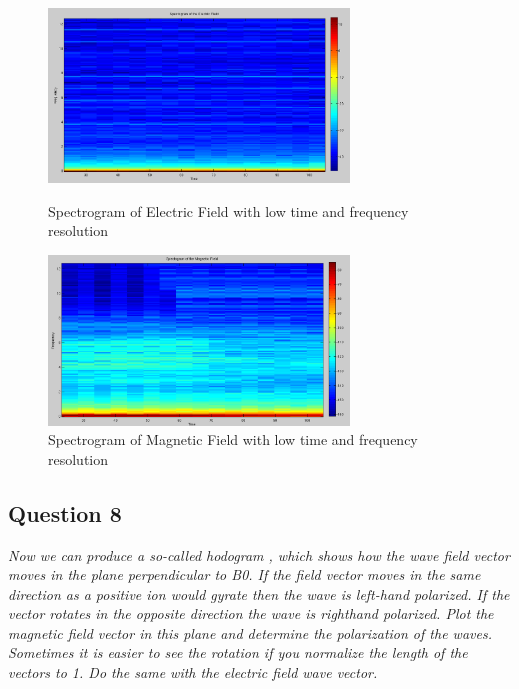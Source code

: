 \documentclass{article}
\begin{document}
\begin{figure}[ht]
\begin{minipage}[c]{0.5\linewidth}
\centering
\includegraphics[width=8cm]{Figures/spectrogram_electricLR.png}
\caption{Spectrogram of Electric Field with low time and frequency resolution}
\label{fig:spectrogram_electricLR}
\end{minipage}
\hspace{0.1cm}
\begin{minipage}[c]{0.5\linewidth}
\centering
\includegraphics[width=8cm]{Figures/spectrogram_magneticLR.png}
\caption{Spectrogram of Magnetic Field with low time and frequency resolution}
\label{fig:spectrogram_magneticLR}
\end{minipage}
\end{figure}

\subsection{Question 8}
\textit{Now we can produce a so-called hodogram , which shows how the wave field vector moves in the plane perpendicular to B0. If the field vector moves in the same direction as a positive ion would gyrate then the wave is left-hand polarized. If the vector rotates in the opposite direction the wave is righthand polarized. Plot the magnetic field vector in this plane and determine the polarization of the waves. Sometimes it is easier to see the rotation if you normalize the length of the vectors to 1. Do the same with the electric field wave vector.}
\end{document}
